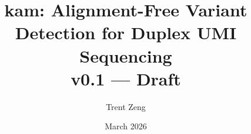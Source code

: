 \documentclass[10pt, twocolumn]{article}
\title{kam: Alignment-Free Variant Detection for Duplex UMI Sequencing\\
\large v0.1 --- Draft}
\author{Trent Zeng}
\date{March 2026}
\begin{document}
\maketitle

\begin{abstract}

\end{abstract}










\printbibliography
\end{document}
